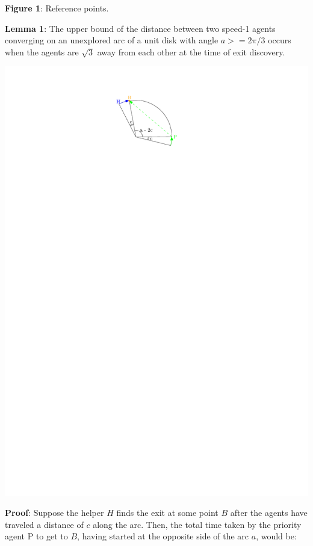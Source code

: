 \documentclass[11pt]{article}
\begin{document}
\begin{center}
    \textbf{Figure 1}: Reference points.
\end{center}

\begin{flushleft}

\vspace*{5mm} \textbf{Lemma 1}: The upper bound of the distance between two speed-1 agents converging on an unexplored arc
of a unit disk with angle $a >= 2\pi/3$ occurs when the agents are $\sqrt{3}$ away from
each other at the time of exit discovery.
\begin{center}
    \includegraphics{mypics/lemma1-references.pdf}
\end{center}
\vspace*{5mm} \textbf{Proof}: Suppose the helper $H$ finds the exit at some point $B$ after the agents
have traveled a distance of $c$ along the arc. Then, the total time taken by the priority agent P
to get to $B$, having started at the opposite side of the arc $a$, would be:


\end{flushleft}
\end{document}
